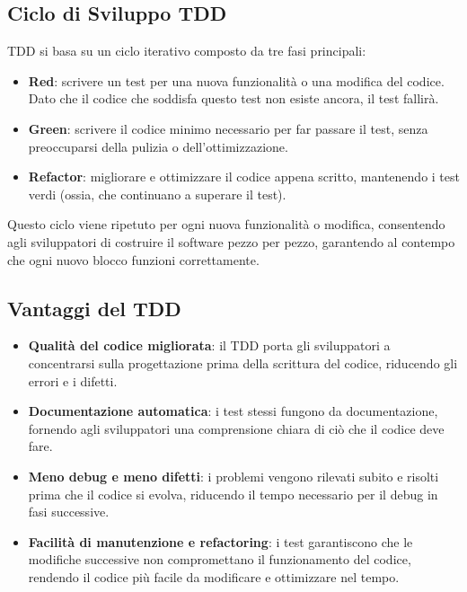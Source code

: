 \documentclass{article}
\begin{document}
\subsection{Ciclo di Sviluppo TDD}
TDD si basa su un ciclo iterativo composto da tre fasi principali:
\begin{itemize}
    \item \textbf{Red}: scrivere un test per una nuova funzionalità o una modifica del codice. Dato che il codice che soddisfa questo test non esiste ancora, il test fallirà.
    \item \textbf{Green}: scrivere il codice minimo necessario per far passare il test, senza preoccuparsi della pulizia o dell'ottimizzazione.
    \item \textbf{Refactor}: migliorare e ottimizzare il codice appena scritto, mantenendo i test verdi (ossia, che continuano a superare il test).
\end{itemize}
Questo ciclo viene ripetuto per ogni nuova funzionalità o modifica, consentendo agli sviluppatori di costruire il software pezzo per pezzo, garantendo al contempo che ogni nuovo blocco funzioni correttamente.

\subsection{Vantaggi del TDD}
\begin{itemize}
    \item \textbf{Qualità del codice migliorata}: il TDD porta gli sviluppatori a concentrarsi sulla progettazione prima della scrittura del codice, riducendo gli errori e i difetti.
    \item \textbf{Documentazione automatica}: i test stessi fungono da documentazione, fornendo agli sviluppatori una comprensione chiara di ciò che il codice deve fare.
    \item \textbf{Meno debug e meno difetti}: i problemi vengono rilevati subito e risolti prima che il codice si evolva, riducendo il tempo necessario per il debug in fasi successive.
    \item \textbf{Facilità di manutenzione e refactoring}: i test garantiscono che le modifiche successive non compromettano il funzionamento del codice, rendendo il codice più facile da modificare e ottimizzare nel tempo.
\end{itemize}
\end{document}
